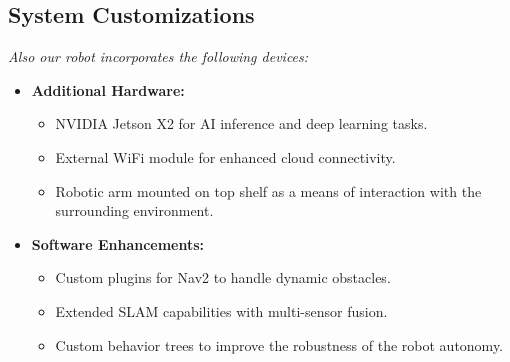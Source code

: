 \subsection*{System Customizations}
\noindent\textit{Also our robot incorporates the following devices:}
\begin{itemize}
    \item \textbf{Additional Hardware:}
        \begin{itemize}
            \item NVIDIA Jetson X2 for AI inference and deep learning tasks.
            \item External WiFi module for enhanced cloud connectivity.
            \item Robotic arm mounted on top shelf as a means of interaction with the surrounding environment.
        \end{itemize}
    \item \textbf{Software Enhancements:}
        \begin{itemize}
            \item Custom plugins for Nav2 to handle dynamic obstacles.
            \item Extended SLAM capabilities with multi-sensor fusion.
            \item Custom behavior trees to improve the robustness of the robot autonomy.
        \end{itemize}
\end{itemize}